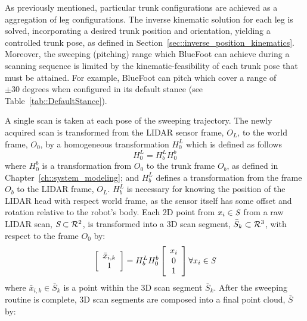 			As previously mentioned, particular trunk configurations are achieved as a aggregation of leg configurations. The inverse kinematic solution for each leg is solved, incorporating a desired trunk position and orientation, yielding a controlled trunk pose, as defined in Section~\ref{sec::inverse_position_kinematics}. Moreover, the sweeping (pitching) range which BlueFoot can achieve during a scanning sequence is limited by the kinematic-feasibility of each \Kth trunk pose that must be attained. For example, BlueFoot can pitch which cover a range of $\pm 30\text{ degrees}$ when configured in its default stance (see Table~\ref{tab::DefaultStance}).

			A single scan is taken at each \Kth pose of the sweeping trajectory. The newly acquired scan is transformed from the LIDAR sensor frame, $O_{L}$, to the world frame, $O_{0}$, by a homogeneous transformation $H^{L}_{0}$ which is defined as follows
				\begin{equation}
					H^{L}_{0} = H^{L}_{b} H^{b}_{0}
					\label{eq::world_to_sensor}
				\end{equation}
			where $H^{b}_{0}$ is a transformation from $O_{0}$ to the trunk frame $O_{b}$, as defined in Chapter~\ref{ch::system_modeling}; and $H^{L}_{b}$ defines a transformation from the frame $O_{b}$ to the LIDAR frame, $O_{L}$. $H^{L}_{b}$ is necessary for knowing the position of the LIDAR head with respect world frame, as the sensor itself has some offset and rotation relative to the robot's body. Each 2D point from $x_{i} \in \emph{S}$ from a raw LIDAR scan, $\emph{S} \subset {\cal R}^{2}$, is transformed into a 3D scan segment, $\bar{S}_{k} \subset {\cal R}^{3}$, with respect to the frame $O_{0}$ by:
				\begin{equation}
					\left[
						\begin{array}{c}
							\bar{x}_{i,k} \\ 1
						\end{array}
					\right]
				 = H^{L}_{b} H^{b}_{0}	
					\left[
						\begin{array}{c}
							x_{i} \\ 0 \\ 1
						\end{array}
					\right] \forall x_{i} \in \emph{S}
					\label{eq::scan_to_segment}
				\end{equation}
			where $\bar{x}_{i,k} \in \bar{S}_{k}$ is a point within the \Kth 3D scan segment $\bar{S}_{k}$. After the sweeping routine is complete, 3D scan segments are composed into a final point cloud, $\bar{S}$ by:
